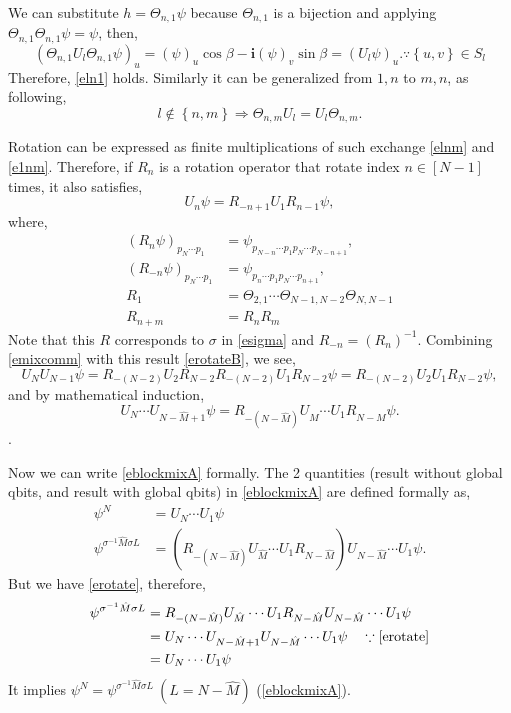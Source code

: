 \documentclass[a4paper]{article}
\newcommand{\eqlabel}[1]{\label{#1}}
\newcommand{\br}[1]{\left(#1\right)}
\newcommand{\cbr}[1]{\left\{#1\right\}}
\newcommand{\ci}{\mathbf{i}}
\newcommand{\hatM}{{\hat{M}}}
\begin{document}
We can substitute \(h = \Theta_{n,1}\psi\) because \(\Theta_{n, 1}\) is a bijection and applying \( \Theta_{n,1}\Theta_{n,1}\psi = \psi\), then, 
\begin{equation}
   \br{\Theta_{n,1} U_l \Theta_{n,1}\psi }_{u}  = \br{\psi}_u\cos\beta - \ci\br{\psi}_v \sin \beta = \br{U_l \psi}_u. \because \cbr{u, v}\in S_l
\end{equation}
Therefore, \eqref{eln1} holds. Similarly it can be generalized from \(1, n\) to \(m, n\), as following, 
\begin{equation}
    \eqlabel{elnm}
l \not\in\cbr{n, m}\Rightarrow \Theta_{n, m} U_l = U_l \Theta_{n, m}.
\end{equation}

Rotation can be expressed as finite multiplications of such exchange \eqref{elnm} and \eqref{e1nm}. Therefore, if \(R_n\) is a rotation operator that rotate index \(n\in[N-1]\) times, it also satisfies, 
\begin{equation}
    \eqlabel{erotateB}
    U_{n} \psi = R_{-n+1}  U_{1} R_{n-1}\psi,
\end{equation}
where,
\begin{align*}
\br{R_{n}\psi}_{p_N\cdots p_1} &= \psi_{p_{N-n}\cdots p_1p_N\cdots p_{N-n+1}},\\
\br{R_{-n}\psi}_{p_N\cdots p_1}&= \psi_{p_{n}\cdots p_1p_N\cdots p_{n+1}},\\
R_1 &= \Theta_{2,1}\cdots\Theta_{N-1, N-2}\Theta_{N, N-1}\\
R_{n+m} &= R_n R_m
\end{align*}
Note that this \(R\) corresponds to \(\sigma\) in \eqref{esigma} and \(R_{-n}= \br{R_n}^{-1}\). Combining \eqref{emixcomm} with this result \eqref{erotateB}, we see,
\[
    U_{N}U_{N-1} \psi = R_{-(N-2)}  U_{2}  R_{N-2}R_{-(N-2)}U_{1} R_{N-2}\psi =R_{-(N-2)}  U_{2} U_{1} R_{N-2}\psi ,
\]
and by mathematical induction, 
\begin{equation}
    \eqlabel{erotate}
    U_{N}\cdots U_{N-\hatM+1} \psi = R_{-(N-\hatM)} U_{\hatM} \cdots U_{1} R_{N-\hatM}\psi.
\end{equation}.

Now we can write \eqref{eblockmixA} formally. The 2 quantities (result without global qbits, and result with global qbits) in \eqref{eblockmixA} are defined formally as,
\begin{align*}
    \psi^N &=  U_{N}\cdots U_{1} \psi\\
    \psi^{\sigma^{-1}\hatM\sigma L} &= \br{R_{-(N-\hatM)} U_{\hatM} \cdots U_{1} R_{N-\hatM} }U_{N-\hatM} \cdots U_1 \psi.
\end{align*}
But we have \eqref{erotate}, therefore, 
\begin{align*}
    \psi^{\sigma^{-1}\hatM\sigma L} &= R_{-(N-\hatM)} U_{\hatM} \cdots U_{1} R_{N-\hatM} U_{N-\hatM} \cdots U_1 \psi\\
    & =  U_{N}\cdots U_{N-\hatM+1}  U_{N-\hatM} \cdots U_1 \psi \quad\because \eqref{erotate}\\
    & =  U_{N}\cdots U_1 \psi 
\end{align*}
It implies \(\psi^N = \psi^{\sigma^{-1}\hatM\sigma L}\ (L=N-\hatM)\) (\eqref{eblockmixA}).
\end{document}
